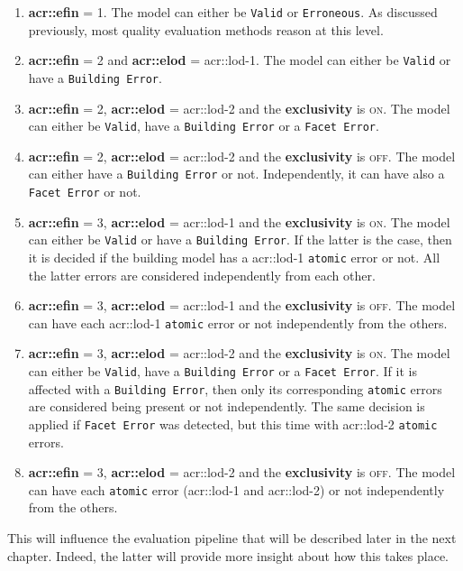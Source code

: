         \begin{enumerate}[label=\roman*)]
            \item \textbf{\gls{acr::efin}} = 1.
                    The model can either be \texttt{Valid} or \texttt{Erroneous}.
                    As discussed previously, most quality evaluation methods reason at this level.
            \item \textbf{\gls{acr::efin}} = 2 and \textbf{\gls{acr::elod}} = \gls{acr::lod}-1.
                    The model can either be \texttt{Valid} or have a \texttt{Building Error}.
            \item \textbf{\gls{acr::efin}} = 2, \textbf{\gls{acr::elod}} = \gls{acr::lod}-2 and the \textbf{exclusivity} is \textsc{on}.
                    The model can either be \texttt{Valid}, have a \texttt{Building Error} or a \texttt{Facet Error}.
            \item \textbf{\gls{acr::efin}} = 2, \textbf{\gls{acr::elod}} = \gls{acr::lod}-2 and the \textbf{exclusivity} is \textsc{off}.
                    The model can either have a \texttt{Building Error} or not.
                    Independently, it can have also a \texttt{Facet Error} or not.
            \item \textbf{\gls{acr::efin}} = 3, \textbf{\gls{acr::elod}} = \gls{acr::lod}-1 and the \textbf{exclusivity} is \textsc{on}.
                    The model can either be \texttt{Valid} or have a \texttt{Building Error}.
                    If the latter is the case, then it is decided if the building model has a \gls{acr::lod}-1 \texttt{atomic} error or not.
                    All the latter errors are considered independently from each other.
            \item \textbf{\gls{acr::efin}} = 3, \textbf{\gls{acr::elod}} = \gls{acr::lod}-1 and the \textbf{exclusivity} is \textsc{off}.
                    The model can have each \gls{acr::lod}-1 \texttt{atomic} error or not independently from the others.
            \item \textbf{\gls{acr::efin}} = 3, \textbf{\gls{acr::elod}} = \gls{acr::lod}-2 and the \textbf{exclusivity} is \textsc{on}.
                    The model can either be \texttt{Valid}, have a \texttt{Building Error} or a \texttt{Facet Error}.
                    If it is affected with a \texttt{Building Error}, then only its corresponding \texttt{atomic} errors are considered being present or not independently.
                    The same decision is applied if \texttt{Facet Error} was detected, but this time with \gls{acr::lod}-2 \texttt{atomic} errors.
            \item \textbf{\gls{acr::efin}} = 3, \textbf{\gls{acr::elod}} = \gls{acr::lod}-2 and the \textbf{exclusivity} is \textsc{off}.
                    The model can have each \texttt{atomic} error (\gls{acr::lod}-1 and \gls{acr::lod}-2) or not independently from the others.
        \end{enumerate}

        This will influence the evaluation pipeline that will be described later in the next chapter.
        Indeed, the latter will provide more insight about how this takes place.
